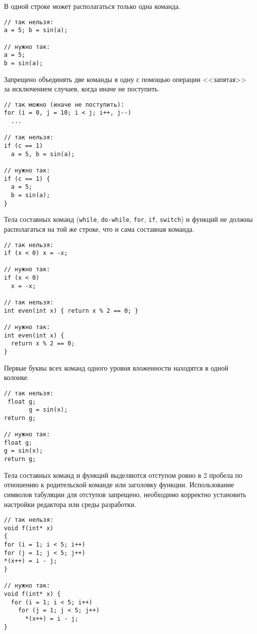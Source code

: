 \zzstyleitem
В одной строке может располагаться только одна команда.

\begin{verbatim}
// так нельзя:
a = 5; b = sin(a);

// нужно так:
a = 5;
b = sin(a);
\end{verbatim}

\zzstyleitem

Запрещено объединять две команды в одну с помощью операции <<запятая>>
за исключением случаев, когда иначе не поступить.

\begin{verbatim}
// так можно (иначе не поступить):
for (i = 0, j = 10; i < j; i++, j--)
  ...

// так нельзя:
if (c == 1)
  a = 5, b = sin(a);

// нужно так:
if (c == 1) {
  a = 5;
  b = sin(a);
}
\end{verbatim}

\zzstyleitem

Тела составных команд (\texttt{while}, \texttt{do-while}, \texttt{for},
\texttt{if}, \texttt{switch}) и функций не должны располагаться на той
же строке, что и сама составная команда.

\begin{verbatim}
// так нельзя:
if (x < 0) x = -x;

// нужно так:
if (x < 0)
  x = -x;

// так нельзя:
int even(int x) { return x % 2 == 0; }

// нужно так:
int even(int x) {
  return x % 2 == 0;
}
\end{verbatim}

\zzstyleitem

Первые буквы всех команд одного уровня вложенности находятся в одной
колонке.

\begin{verbatim}
// так нельзя:
 float g;
       g = sin(x);
return g;

// нужно так:
float g;
g = sin(x);
return g;
\end{verbatim}

\zzstyleitem

Тела составных команд и функций выделяются отступом ровно в 2 пробела по
отношению к родительской команде или заголовку функции. Использование
символов табуляции для отступов запрещено, необходимо корректно
установить настройки редактора или среды разработки.

\begin{verbatim}
// так нельзя:
void f(int* x)
{
for (i = 1; i < 5; i++)
for (j = 1; j < 5; j++)
*(x++) = i - j;
}

// нужно так:
void f(int* x) {
  for (i = 1; i < 5; i++)
    for (j = 1; j < 5; j++)
      *(x++) = i - j;
}
\end{verbatim}

